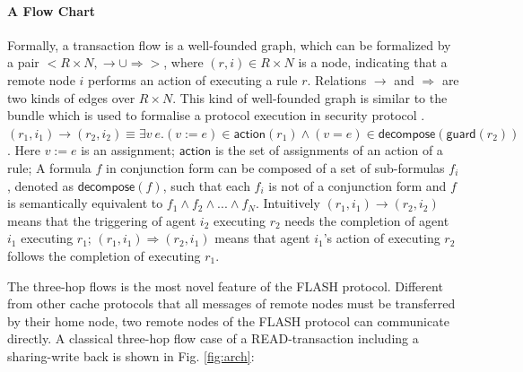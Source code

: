 \documentclass{llncs-new}
\begin{document}
\vspace{-10pt}

\paragraph*{A Flow Chart}Formally, a transaction flow is a well-founded graph, which can be formalized by a pair $<R \times N, \rightarrow \cup \Rightarrow>$, where $(r,i) \in R \times N$ is a  node, indicating that a remote node $i$ performs an action of executing a rule $r$. Relations  $\rightarrow$  and $\Rightarrow$ are two kinds of edges over $R \times N$. This kind of well-founded graph is similar to the bundle which is used to formalise a protocol execution in security protocol \cite{LP13}.   $(r_1,i_1) \rightarrow (r_2,i_2) \equiv \exists v~e. (v:=e) \in \mathsf{action}(r_1) \land (v=e) \in \mathsf{decompose}(\mathsf{guard}(r_2))$. Here $v:=e$ is an assignment; $\mathsf{action}$ is the set of assignments of an action of a rule; A formula $f$ in conjunction form can be composed of a set of sub-formulas $f_i$, denoted as $\mathsf{decompose}(f)$, such that each $f_i$  is not of a conjunction form and $f$ is semantically equivalent to $f_1 \land f_2 \land ... \land f_N$. Intuitively $(r_1,i_1) \rightarrow (r_2,i_2)$ means that the triggering of agent $i_2$ executing $r_2$ needs the completion of agent $i_1$ executing $r_1$; $(r_1,i_1) \Rightarrow (r_2,i_1)$ means that agent $i_1$'s action of executing $r_2$ follows the completion of  executing $r_1$. %

The three-hop flows is the most novel feature of the FLASH protocol. Different from other cache protocols that all messages of remote nodes must be transferred by their home node, two remote nodes of the FLASH protocol can communicate directly. A classical three-hop flow case of a READ-transaction including a sharing-write back is shown in Fig. \ref{fig:arch}:
\end{document}

